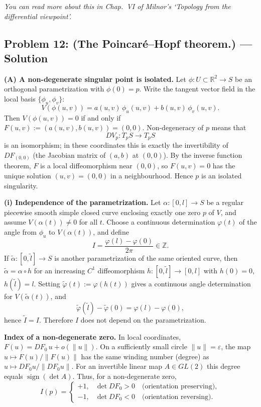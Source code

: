 \documentclass[12pt,a4paper]{article}
\theoremstyle{plain}
\theoremstyle{definition}      %
\begin{document}
	\medskip
	\noindent\emph{You can read more about this in Chap.\ VI of Milnor's `Topology from the differential viewpoint'.}
	
	
	\subsection*{Problem 12: (The Poincar\'e--Hopf theorem.) --- Solution}
	
	\noindent\textbf{(A) A non-degenerate singular point is isolated.}
	Let $\phi:U\subset\mathbb{R}^2\to S$ be an orthogonal parametrization with $\phi(0)=p$.
	Write the tangent vector field in the local basis $\{\phi_u,\phi_v\}$:
	\[
	V(\phi(u,v))=a(u,v)\,\phi_u(u,v)+b(u,v)\,\phi_v(u,v).
	\]
	Then $V(\phi(u,v))=0$ if and only if $F(u,v):=(a(u,v),b(u,v))=(0,0)$.
	Non-degeneracy of $p$ means that
	\[
	DV_p:T_pS\to T_pS
	\]
	is an isomorphism; in these coordinates this is exactly the invertibility of
	$DF_{(0,0)}$ (the Jacobian matrix of $(a,b)$ at $(0,0)$).
	By the inverse function theorem, $F$ is a local diffeomorphism near $(0,0)$,
	so $F(u,v)=0$ has the unique solution $(u,v)=(0,0)$ in a neighbourhood.
	Hence $p$ is an isolated singularity.
	
	\medskip
	\noindent\textbf{(i) Independence of the parametrization.}
	Let $\alpha:[0,l]\to S$ be a regular piecewise smooth simple closed curve enclosing
	exactly one zero $p$ of $V$, and assume $V(\alpha(t))\neq 0$ for all $t$.
	Choose a continuous determination $\varphi(t)$ of the angle from $\phi_u$ to
	$V(\alpha(t))$, and define
	\[
	I=\frac{\varphi(l)-\varphi(0)}{2\pi}\in\mathbb{Z}.
	\]
	If $\tilde\alpha:[0,\tilde l]\to S$ is another parametrization of the same oriented curve,
	then $\tilde\alpha=\alpha\circ h$ for an increasing $C^1$ diffeomorphism
	$h:[0,\tilde l]\to[0,l]$ with $h(0)=0$, $h(\tilde l)=l$.
	Setting $\tilde\varphi(t):=\varphi(h(t))$ gives a continuous angle determination for
	$V(\tilde\alpha(t))$, and
	\[
	\tilde\varphi(\tilde l)-\tilde\varphi(0)=\varphi(l)-\varphi(0),
	\]
	hence $\tilde I=I$. Therefore $I$ does not depend on the parametrization.
	
	\medskip
	\noindent\textbf{Index of a non-degenerate zero.}
	In local coordinates, $F(u)=DF_0\,u+o(\|u\|)$.
	On a sufficiently small circle $\|u\|=\varepsilon$,
	the map $u\mapsto F(u)/\|F(u)\|$ has the same winding number (degree) as
	$u\mapsto DF_0u/\|DF_0u\|$.
	For an invertible linear map $A\in GL(2)$ this degree equals $\operatorname{sign}(\det A)$.
	Thus, for a non-degenerate zero,
	\[
	I(p)=
	\begin{cases}
		+1, & \det DF_0>0 \quad\text{(orientation preserving)},\\
		-1, & \det DF_0<0 \quad\text{(orientation reversing)}.
	\end{cases}
	\]
	
\end{document}
